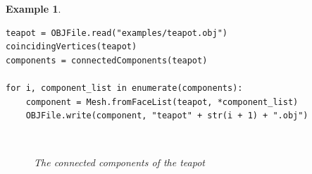 \documentclass{article}
\newtheorem{ex}{Example}
\begin{document}
\begin{ex}
\begin{lstlisting}
teapot = OBJFile.read("examples/teapot.obj")
coincidingVertices(teapot)
components = connectedComponents(teapot)

for i, component_list in enumerate(components):
    component = Mesh.fromFaceList(teapot, *component_list)
    OBJFile.write(component, "teapot" + str(i + 1) + ".obj")
    \end{lstlisting}
    \begin{figure}[ht]
    \centering
    \hfil
    \hfil\\
    \hfil
    \hfil
    \caption{The connected components of the teapot}
    \label{fig:einsteinex}
\end{figure}
\end{ex}
\end{document}
